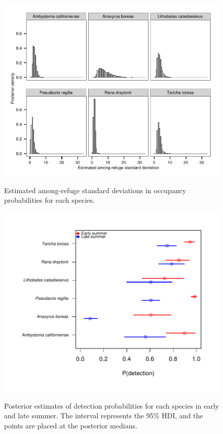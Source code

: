 \begin{figure}[htbp]
\caption[Among refuge variance parameters for occupancy probabilities]{
Estimated among-refuge standard deviations in occupancy probabilities
for each species.
}
\centering
\includegraphics[width=150mm]{figs/ch3/fig_s3.pdf}
\label{3-a3}
\end{figure}

\begin{figure}[htbp]
\caption[Detection parameter estimates]{
Posterior estimates of detection probabilities for each species in early
and late summer. The interval represents the 95\% HDI, and the points
are placed at the posterior medians.
}
\centering
\includegraphics[width=150mm]{figs/ch3/fig_s4.pdf}
\label{3-a4}
\end{figure}


